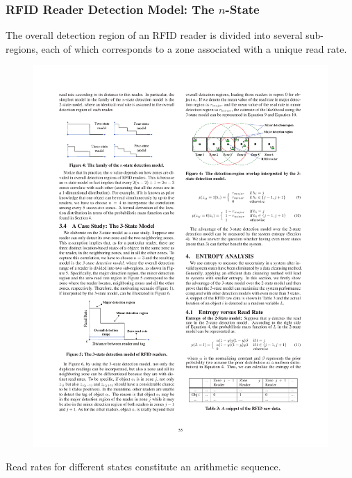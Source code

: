 
\begin{frame}
\frametitle{RFID Reader Detection Model: The $n$-State}

The overall detection region of an RFID reader is divided into several sub-regions, each of which corresponds to a zone associated with a unique read rate.

\begin{figure}[tb]
  \includegraphics[width=0.8\columnwidth]{figures/3-1/3-1-5.pdf}
\end{figure}

Read rates for different states constitute an arithmetic sequence.

\end{frame}


